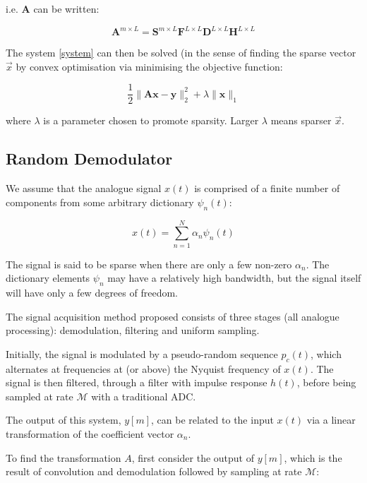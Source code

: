 \documentclass{article}
\begin{document}
i.e. \(\textbf{A}\) can be written: 

\begin{equation}
\textbf{A}^{m\times L} = \textbf{S}^{m\times L} \textbf{F}^{L\times L} \textbf{D}^{L \times L} \textbf{H}^{L \times L}
\end{equation}

The system  \ref{system} can then be solved (in the sense of finding the sparse vector \(\vec{x}\) by convex optimisation via minimising the objective function:

\begin{equation}
\frac{1}{2}\|\textbf{Ax}-\textbf{y}\|_2^2 + \lambda \|\textbf{x}\|_1
\end{equation}

where \(\lambda\) is a parameter chosen to promote sparsity. Larger \(\lambda\) means sparser \(\vec{x}\).

\subsection{Random Demodulator}
We assume that the analogue signal \(x\left(t\right)\) is comprised of a finite number of components from some arbitrary dictionary \(\psi_n\left(t\right)\):

\begin{equation}
x\left(t\right) = \sum_{n=1}^N \alpha_n \psi_n\left(t\right)
\end{equation}

The signal is said to be sparse when there are only a few non-zero \(\alpha_n\). The dictionary elements \(\psi_n\) may have a relatively high bandwidth, but the signal itself will have only a few degrees of freedom.

The signal acquisition method proposed consists of three stages (all analogue processing): demodulation, filtering and uniform sampling. 

Initially, the signal is modulated by a pseudo-random sequence \(p_c\left(t\right)\), which alternates at frequencies at (or above) the Nyquist frequency of \(x\left(t\right)\). The signal is then filtered, through a filter with impulse response \(h\left(t\right)\), before being sampled at rate \(\mathcal{M}\) with a traditional ADC.

The output of this system, \(y\left[m\right]\), can be related to the input \(x\left(t\right)\) via a linear transformation of the coefficient vector \(\alpha_n\). 

To find the transformation \(A\), first consider the output of \(y\left[m\right]\), which is the result of convolution and demodulation followed by sampling at rate \(\mathcal{M}\):
\end{document}
